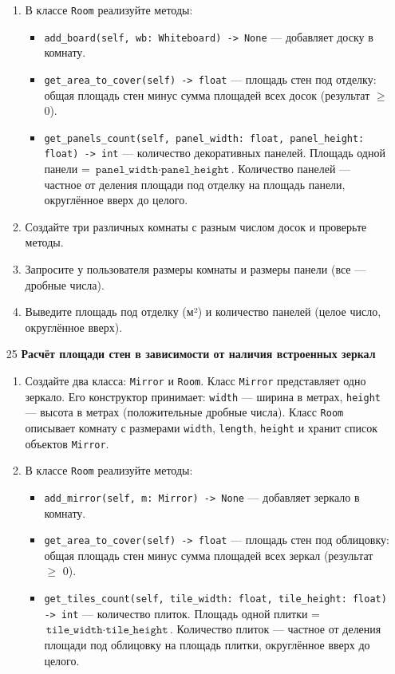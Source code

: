\begin{enumerate}
\begin{enumerate}
    \item В классе \texttt{Room} реализуйте методы:  
    \begin{itemize}
        \item \texttt{add\_board(self, wb: Whiteboard) -> None} — добавляет доску в комнату.
        \item \texttt{get\_area\_to\_cover(self) -> float} — площадь стен под отделку: общая площадь стен минус сумма площадей всех досок (результат $\geqslant$ 0).
        \item \texttt{get\_panels\_count(self, panel\_width: float, panel\_height: float) -> int} — количество декоративных панелей. Площадь одной панели = \(\texttt{panel\_width} \cdot \texttt{panel\_height}\). Количество панелей — частное от деления площади под отделку на площадь панели, округлённое вверх до целого.
    \end{itemize}

    \item Создайте три различных комнаты с разным числом досок и проверьте методы.

    \item Запросите у пользователя размеры комнаты и размеры панели (все — дробные числа).

    \item Выведите площадь под отделку (м²) и количество панелей (целое число, округлённое вверх).
\end{enumerate}

\item[25] \textbf{Расчёт площади стен в зависимости от наличия встроенных зеркал}
\begin{enumerate}
    \item Создайте два класса: \texttt{Mirror} и \texttt{Room}.  
    Класс \texttt{Mirror} представляет одно зеркало. Его конструктор принимает:  
    \texttt{width} — ширина в метрах,  
    \texttt{height} — высота в метрах (положительные дробные числа).  
    Класс \texttt{Room} описывает комнату с размерами \texttt{width}, \texttt{length}, \texttt{height} и хранит список объектов \texttt{Mirror}.

    \item В классе \texttt{Room} реализуйте методы:  
    \begin{itemize}
        \item \texttt{add\_mirror(self, m: Mirror) -> None} — добавляет зеркало в комнату.
        \item \texttt{get\_area\_to\_cover(self) -> float} — площадь стен под облицовку: общая площадь стен минус сумма площадей всех зеркал (результат $\geqslant$ 0).
        \item \texttt{get\_tiles\_count(self, tile\_width: float, tile\_height: float) -> int} — количество плиток. Площадь одной плитки = \(\texttt{tile\_width} \cdot \texttt{tile\_height}\). Количество плиток — частное от деления площади под облицовку на площадь плитки, округлённое вверх до целого.
    \end{itemize}


\end{enumerate}
\end{enumerate}
